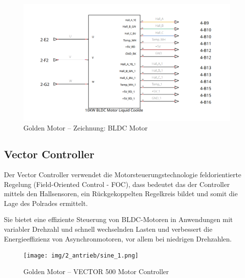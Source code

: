\begin{figure}[ht]
	\begin{center}
		\includegraphics[width=\textwidth]{img/2_imp/2_circ_bldc_motor.png}
		\caption{Golden Motor – Zeichnung: BLDC Motor}
		\label{img_2_2:circ_bldc:1}
	\end{center}
\end{figure}


\subsection{Vector Controller}
Der Vector Controller verwendet die Motorsteuerungstechnologie feldorientierte Regelung (Field-Oriented Control - FOC), dass bedeutet das der Controller mittels den Hallsensoren, ein Rückgekoppelten Regelkreis bildet und somit die Lage des Polrades ermittelt.

\cite{schroeder:elektische_antriebe}

Sie bietet eine effiziente Steuerung von BLDC-Motoren in Anwendungen mit variabler Drehzahl und schnell wechselnden Lasten und verbessert die Energieeffizienz von Asynchronmotoren, vor allem bei niedrigen Drehzahlen.


\begin{figure}[!ht]
	\begin{center}
		\texttt{[image: img/2\_antrieb/sine\_1.png]}
		\caption{Golden Motor – VECTOR 500 Motor Controller}
		\label{img_2_2:antrieb_sine:1}
	\end{center}
\end{figure}


